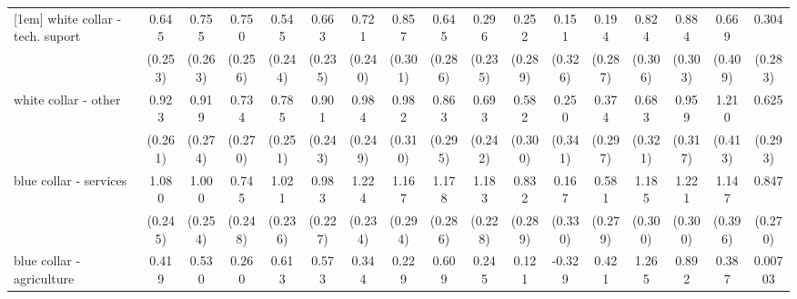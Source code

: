 {\begin{tabular}{l*{16}{c}}
[1em]
white collar - tech. suport&       0.645\sym{*}  &       0.755\sym{**} &       0.750\sym{**} &       0.545\sym{*}  &       0.663\sym{**} &       0.721\sym{**} &       0.857\sym{**} &       0.645\sym{*}  &       0.296         &       0.252         &       0.151         &       0.194         &       0.824\sym{**} &       0.884\sym{**} &       0.669         &       0.304         \\
                    &     (0.253)         &     (0.263)         &     (0.256)         &     (0.244)         &     (0.235)         &     (0.240)         &     (0.301)         &     (0.286)         &     (0.235)         &     (0.289)         &     (0.326)         &     (0.287)         &     (0.306)         &     (0.303)         &     (0.409)         &     (0.283)         \\
[1em]
white collar - other&       0.923\sym{***}&       0.919\sym{***}&       0.734\sym{**} &       0.785\sym{**} &       0.901\sym{***}&       0.984\sym{***}&       0.982\sym{**} &       0.863\sym{**} &       0.693\sym{**} &       0.582         &       0.250         &       0.374         &       0.683\sym{*}  &       0.959\sym{**} &       1.210\sym{**} &       0.625\sym{*}  \\
                    &     (0.261)         &     (0.274)         &     (0.270)         &     (0.251)         &     (0.243)         &     (0.249)         &     (0.310)         &     (0.295)         &     (0.242)         &     (0.300)         &     (0.341)         &     (0.297)         &     (0.321)         &     (0.317)         &     (0.413)         &     (0.293)         \\
[1em]
blue collar - services&       1.080\sym{***}&       1.000\sym{***}&       0.745\sym{**} &       1.021\sym{***}&       0.983\sym{***}&       1.224\sym{***}&       1.167\sym{***}&       1.178\sym{***}&       1.183\sym{***}&       0.832\sym{**} &       0.167         &       0.581\sym{*}  &       1.185\sym{***}&       1.221\sym{***}&       1.147\sym{**} &       0.847\sym{**} \\
                    &     (0.245)         &     (0.254)         &     (0.248)         &     (0.236)         &     (0.227)         &     (0.234)         &     (0.294)         &     (0.286)         &     (0.228)         &     (0.289)         &     (0.330)         &     (0.279)         &     (0.300)         &     (0.300)         &     (0.396)         &     (0.270)         \\
[1em]
blue collar - agriculture&       0.419         &       0.530         &       0.260         &       0.613\sym{*}  &       0.573\sym{*}  &       0.344         &       0.229         &       0.609         &       0.245         &       0.121         &      -0.329         &       0.421         &       1.265\sym{***}&       0.892\sym{*}  &       0.387         &     0.00703         \\

\end{tabular}}
